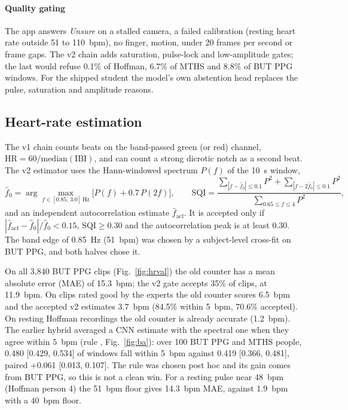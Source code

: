 \documentclass[11pt,letterpaper]{article}
\newcommand{\code}[1]{\texttt{\detokenize{#1}}}
\begin{document}
\paragraph{Quality gating} The app answers \emph{Unsure} on a stalled camera, a failed calibration (resting heart rate outside 51 to 110~bpm), no finger, motion, under 20 frames per second or frame gaps. The v2 chain adds saturation, pulse-lock and low-amplitude gates; the last would refuse 0.1\% of Hoffman, 6.7\% of MTHS and 8.8\% of BUT PPG windows. For the shipped student the model's own abstention head replaces the pulse, saturation and amplitude reasons.

\subsection{Heart-rate estimation}\label{sec:hr}
The v1 chain counts beats on the band-passed green (or red) channel, $\mathrm{HR}=60/\mathrm{median}(\mathrm{IBI})$, and can count a strong dicrotic notch as a second beat. The v2 estimator uses the Hann-windowed spectrum $P(f)$ of the 10~s window,
\begin{equation}
\hat f_0=\arg\max_{f\in[0.85,\,3.0]\,\mathrm{Hz}}\big[P(f)+0.7\,P(2f)\big],\qquad
\mathrm{SQI}=\frac{\sum_{|f-\hat f_0|\le0.1}P^2+\sum_{|f-2\hat f_0|\le0.1}P^2}{\sum_{0.65\le f\le4}P^2},
\end{equation}
and an independent autocorrelation estimate $\hat f_{\mathrm{acf}}$. It is accepted only if $|\hat f_{\mathrm{acf}}-\hat f_0|/\hat f_0<0.15$, $\mathrm{SQI}\ge0.30$ and the autocorrelation peak is at least 0.30. The band edge of 0.85~Hz (51~bpm) was chosen by a subject-level cross-fit on BUT PPG, and both halves chose it.

On all 3,840 BUT PPG clips (Fig.~\ref{fig:hrval}) the old counter has a mean absolute error (MAE) of 15.3~bpm; the v2 gate accepts 35\% of clips, at 11.9~bpm. On clips rated good by the experts the old counter scores 6.5~bpm and the accepted v2 estimates 3.7~bpm (84.5\% within 5~bpm, 70.6\% accepted). On resting Hoffman recordings the old counter is already accurate (1.2~bpm). The earlier hybrid averaged a CNN estimate with the spectral one when they agree within 5~bpm (rule \code{agree}, Fig.~\ref{fig:ba}): over 100 BUT PPG and MTHS people, 0.480 [0.429, 0.534] of windows fall within 5~bpm against 0.419 [0.366, 0.481], paired +0.061 [0.013, 0.107]. The rule was chosen post hoc and its gain comes from BUT PPG, so this is not a clean win. For a resting pulse near 48~bpm (Hoffman person 4) the 51~bpm floor gives 14.3~bpm MAE, against 1.9~bpm with a 40~bpm floor.
\end{document}
